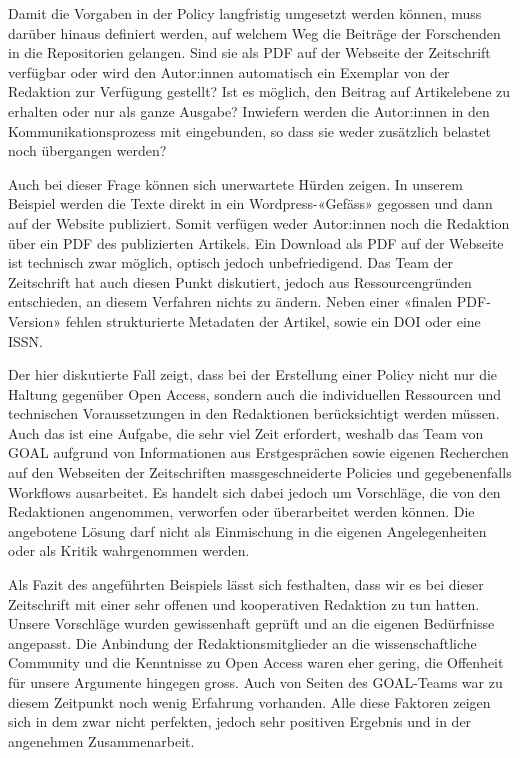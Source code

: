 \documentclass[a4paper,
fontsize=11pt,
oneside,
numbers=noperiodatend,
parskip=half-,
bibliography=totoc,
final
]{scrartcl}
\begin{document}
Damit die Vorgaben in der Policy langfristig umgesetzt werden können,
muss darüber hinaus definiert werden, auf welchem Weg die Beiträge der
Forschenden in die Repositorien gelangen. Sind sie als PDF auf der
Webseite der Zeitschrift verfügbar oder wird den Autor:innen automatisch
ein Exemplar von der Redaktion zur Verfügung gestellt? Ist es möglich,
den Beitrag auf Artikelebene zu erhalten oder nur als ganze Ausgabe?
Inwiefern werden die Autor:innen in den Kommunikationsprozess mit
eingebunden, so dass sie weder zusätzlich belastet noch übergangen
werden?

Auch bei dieser Frage können sich unerwartete Hürden zeigen. In unserem
Beispiel werden die Texte direkt in ein Wordpress-«Gefäss» gegossen und
dann auf der Website publiziert. Somit verfügen weder Autor:innen noch
die Redaktion über ein PDF des publizierten Artikels. Ein Download als
PDF auf der Webseite ist technisch zwar möglich, optisch jedoch
unbefriedigend. Das Team der Zeitschrift hat auch diesen Punkt
diskutiert, jedoch aus Ressourcengründen entschieden, an diesem
Verfahren nichts zu ändern. Neben einer «finalen PDF-Version» fehlen
strukturierte Metadaten der Artikel, sowie ein DOI oder eine ISSN.

Der hier diskutierte Fall zeigt, dass bei der Erstellung einer Policy
nicht nur die Haltung gegenüber Open Access, sondern auch die
individuellen Ressourcen und technischen Voraussetzungen in den
Redaktionen berücksichtigt werden müssen. Auch das ist eine Aufgabe, die
sehr viel Zeit erfordert, weshalb das Team von GOAL aufgrund von
Informationen aus Erstgesprächen sowie eigenen Recherchen auf den
Webseiten der Zeitschriften massgeschneiderte Policies und
gegebenenfalls Workflows ausarbeitet. Es handelt sich dabei jedoch um
Vorschläge, die von den Redaktionen angenommen, verworfen oder
überarbeitet werden können. Die angebotene Lösung darf nicht als
Einmischung in die eigenen Angelegenheiten oder als Kritik wahrgenommen
werden.

Als Fazit des angeführten Beispiels lässt sich festhalten, dass wir es
bei dieser Zeitschrift mit einer sehr offenen und kooperativen Redaktion
zu tun hatten. Unsere Vorschläge wurden gewissenhaft geprüft und an die
eigenen Bedürfnisse angepasst. Die Anbindung der Redaktionsmitglieder an
die wissenschaftliche Community und die Kenntnisse zu Open Access waren
eher gering, die Offenheit für unsere Argumente hingegen gross. Auch von
Seiten des GOAL-Teams war zu diesem Zeitpunkt noch wenig Erfahrung
vorhanden. Alle diese Faktoren zeigen sich in dem zwar nicht perfekten,
jedoch sehr positiven Ergebnis und in der angenehmen Zusammenarbeit.
\end{document}
